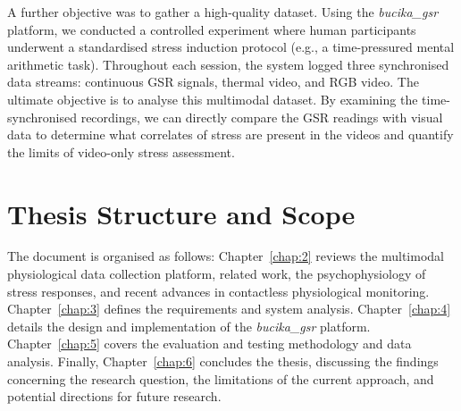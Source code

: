 \documentclass[11pt,a4paper]{report}
\begin{document}
A further objective was to gather a high-quality dataset.  Using the
\textit{bucika\_gsr} platform, we conducted a controlled experiment where human
participants underwent a standardised stress induction protocol (e.g., a
time-pressured mental arithmetic task).  Throughout each session, the system logged
three synchronised data streams: continuous GSR signals, thermal video, and RGB video.
The ultimate objective is to analyse this multimodal dataset.  By examining the
time-synchronised recordings, we can directly compare the GSR readings with visual
data to determine what correlates of stress are present in the videos and quantify
the limits of video-only stress assessment.

\section{Thesis Structure and Scope}

The document is organised as follows: Chapter~\ref{chap:2} reviews the multimodal
physiological data collection platform, related work, the psychophysiology of stress
responses, and recent advances in contactless physiological monitoring.
Chapter~\ref{chap:3} defines the requirements and system analysis.
Chapter~\ref{chap:4} details the design and implementation of the
\textit{bucika\_gsr} platform.  Chapter~\ref{chap:5} covers the evaluation and
testing methodology and data analysis.  Finally, Chapter~\ref{chap:6} concludes the
thesis, discussing the findings concerning the research question, the limitations of
the current approach, and potential directions for future research.



\end{document}

